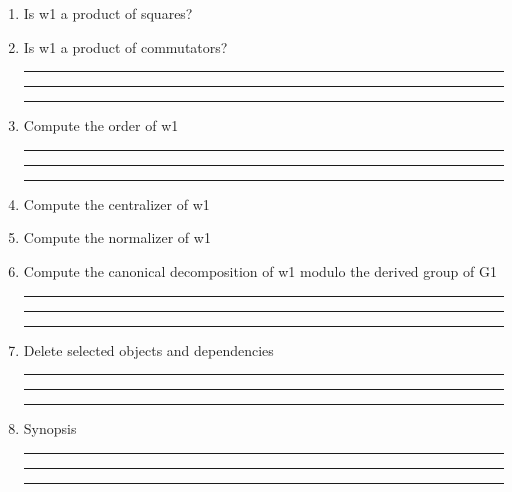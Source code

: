 \begin{enumerate}
\item Is w1 a product of squares?

\item Is w1 a product of commutators?


\bigskip
\hrule\hrule\hrule

\item Compute the order of w1

\bigskip
\hrule\hrule\hrule

\item Compute the centralizer of w1

\item Compute the normalizer of w1

\item Compute the canonical decomposition of w1 modulo the derived
group of G1

\bigskip
\hrule\hrule\hrule

\item Delete selected objects and dependencies

\bigskip
\hrule\hrule\hrule

\item
Synopsis

\bigskip
\hrule\hrule\hrule

\end{enumerate}
